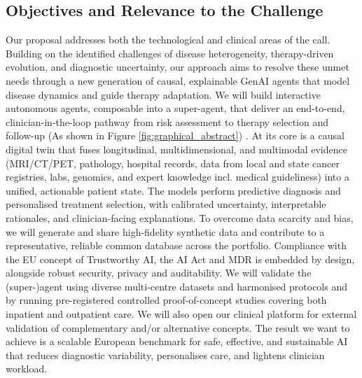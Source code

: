\documentclass[11pt, a4paper]{article}
\begin{document}
\subsection{Objectives and Relevance to the Challenge}
Our proposal addresses both the technological and clinical areas of the call. Building on the identified challenges of disease heterogeneity, therapy-driven evolution, and diagnostic uncertainty, our approach aims to resolve these unmet needs through a new generation of causal, explainable GenAI agents that model disease dynamics and guide therapy adaptation. We will build interactive autonomous agents, composable into a super-agent, that deliver an end-to-end, clinician-in-the-loop pathway from risk assessment to therapy selection and follow-up (As shown in Figure \ref{fig:graphical_abstract}) .  At its core is a causal digital twin that fuses longitudinal, multidimensional, and multimodal evidence (MRI/CT/PET, pathology, hospital records, data from local and state cancer registries, labs, genomics, and expert knowledge incl. medical guideliness) into a unified, actionable patient state. The models perform predictive diagnosis and personalised treatment selection, with calibrated uncertainty, interpretable rationales, and clinician-facing explanations. To overcome data scarcity and bias, we will generate and share high-fidelity synthetic data and contribute to a representative, reliable common database across the portfolio. Compliance with the EU concept of Trustworthy AI, the AI Act and MDR is embedded by design, alongside robust security, privacy and auditability. 
We will validate the (super-)agent using diverse multi-centre datasets and harmonised protocols and by running pre-registered controlled proof-of-concept studies covering both inpatient and outpatient care. We will also open our clinical platform for external validation of complementary and/or alternative concepts. The result we want to achieve is a scalable European benchmark for safe, effective, and sustainable AI that reduces diagnostic variability, personalises care, and lightens clinician workload. 
 
\end{document}

